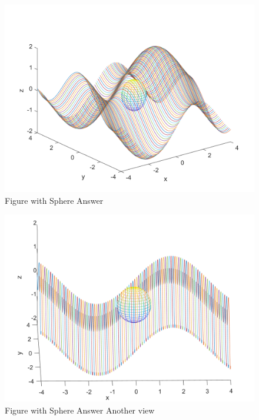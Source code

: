 \begin{figure}[H]
	\caption{Figure with Sphere Answer}
	\centering
	\includegraphics[width=12cm]{Q2/figures/plotwithSphere.png}
\end{figure}
\begin{figure}[H]
	\caption{Figure with Sphere Answer Another view}
	\centering
	\includegraphics[width=12cm]{Q2/figures/plotwithSphereAnother.png}
\end{figure}